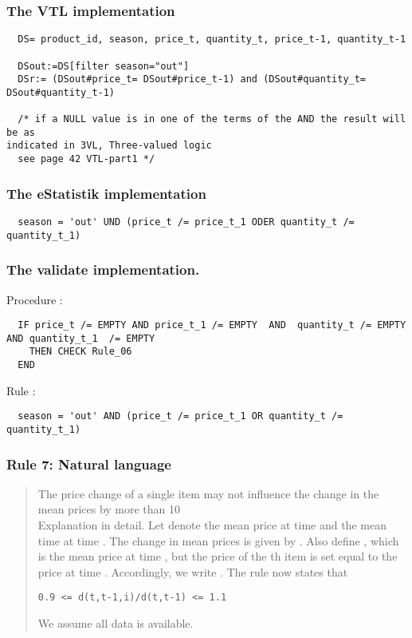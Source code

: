 \subsubsection*{The VTL implementation}
\begin{verbatim}
  DS= product_id, season, price_t, quantity_t, price_t-1, quantity_t-1

  DSout:=DS[filter season="out"]
  DSr:= (DSout#price_t= DSout#price_t-1) and (DSout#quantity_t=
DSout#quantity_t-1)

  /* if a NULL value is in one of the terms of the AND the result will be as
indicated in 3VL, Three-valued logic
  see page 42 VTL-part1 */
\end{verbatim}

\subsubsection*{The eStatistik implementation}
\begin{verbatim}
  season = 'out' UND (price_t /= price_t_1 ODER quantity_t /= quantity_t_1)
\end{verbatim}

\subsubsection*{The validate implementation.}
\noindent
Procedure :
\begin{verbatim}
  IF price_t /= EMPTY AND price_t_1 /= EMPTY  AND  quantity_t /= EMPTY   AND quantity_t_1  /= EMPTY 
    THEN CHECK Rule_06
  END
\end{verbatim}
\noindent
Rule :
\begin{verbatim}
  season = 'out' AND (price_t /= price_t_1 OR quantity_t /= quantity_t_1)
  \end{verbatim}


\newpage

\subsubsection*{  Rule 7: Natural language}
\begin{quote}


The price change of a single item may not influence the change in the mean prices by more than 10\\%

Explanation in detail. Let  denote the mean price at time  and  the mean time at time .
The change in mean prices is given by . Also define , which is the
mean price at time , but the price of the th item is set equal to the price at time . Accordingly, we write . The rule now states that
\begin{verbatim}
0.9 <= d(t,t-1,i)/d(t,t-1) <= 1.1
\end{verbatim}

We assume all data is available.


\end{quote}
